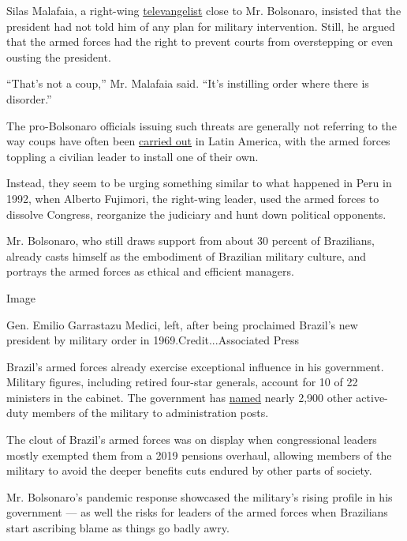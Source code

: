 Silas Malafaia, a right-wing
\href{https://www.nytimes3xbfgragh.onion/2011/11/26/world/americas/silas-malafaia-tv-evangelist-rises-in-brazils-culture-wars.html}{televangelist}
close to Mr. Bolsonaro, insisted that the president had not told him of
any plan for military intervention. Still, he argued that the armed
forces had the right to prevent courts from overstepping or even ousting
the president.

``That's not a coup,'' Mr. Malafaia said. ``It's instilling order where
there is disorder.''

The pro-Bolsonaro officials issuing such threats are generally not
referring to the way coups have often been
\href{https://www.nytimes3xbfgragh.onion/2011/10/21/world/americas/an-apology-for-a-guatemalan-coup-57-years-later.html}{carried
out} in Latin America, with the armed forces toppling a civilian leader
to install one of their own.

Instead, they seem to be urging something similar to what happened in
Peru in 1992, when Alberto Fujimori, the right-wing leader, used the
armed forces to dissolve Congress, reorganize the judiciary and hunt
down political opponents.

Mr. Bolsonaro, who still draws support from about 30 percent of
Brazilians, already casts himself as the embodiment of Brazilian
military culture, and portrays the armed forces as ethical and efficient
managers.

Image

Gen. Emilio Garrastazu Medici, left, after being proclaimed Brazil's new
president by military order in 1969.Credit...Associated Press

Brazil's armed forces already exercise exceptional influence in his
government. Military figures, including retired four-star generals,
account for 10 of 22 ministers in the cabinet. The government has
\href{https://www.poder360.com.br/analise/os-2-897-militares-no-governo-e-a-falta-de-quadros-entre-os-aliados/}{named}
nearly 2,900 other active-duty members of the military to administration
posts.

The clout of Brazil's armed forces was on display when congressional
leaders mostly exempted them from a 2019 pensions overhaul, allowing
members of the military to avoid the deeper benefits cuts endured by
other parts of society.

Mr. Bolsonaro's pandemic response showcased the military's rising
profile in his government --- as well the risks for leaders of the armed
forces when Brazilians start ascribing blame as things go badly awry.

